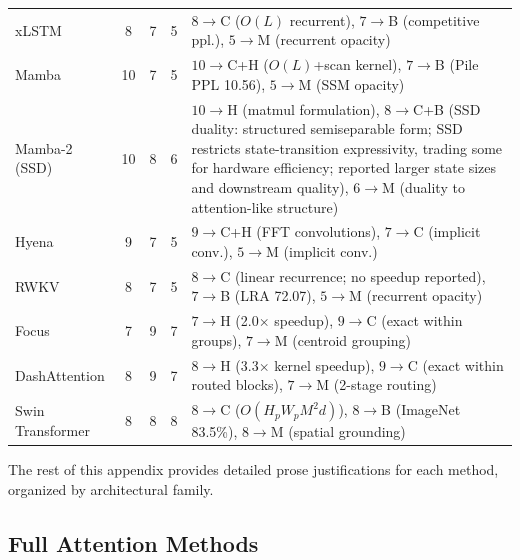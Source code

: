 \documentclass[10pt,twocolumn]{article}
\begin{document}
\begin{table}[!tbp]
\begin{tabular}{p{2.2cm}c c c p{5.5cm}}
xLSTM & 8 & 7 & 5 & $8\!\to\!$C ($O(L)$ recurrent), $7\!\to\!$B (competitive ppl.), $5\!\to\!$M (recurrent opacity) \\
Mamba & 10 & 7 & 5 & $10\!\to\!$C+H ($O(L)$+scan kernel), $7\!\to\!$B (Pile PPL 10.56), $5\!\to\!$M (SSM opacity) \\
Mamba-2 (SSD) & 10 & 8 & 6 & $10\!\to\!$H (matmul formulation), $8\!\to\!$C+B (SSD duality: structured semiseparable form; SSD restricts state-transition expressivity, trading some for hardware efficiency; reported larger state sizes and downstream quality), $6\!\to\!$M (duality to attention-like structure) \\
Hyena & 9 & 7 & 5 & $9\!\to\!$C+H (FFT convolutions), $7\!\to\!$C (implicit conv.), $5\!\to\!$M (implicit conv.) \\
RWKV & 8 & 7 & 5 & $8\!\to\!$C (linear recurrence; no speedup reported), $7\!\to\!$B (LRA 72.07), $5\!\to\!$M (recurrent opacity) \\
Focus & 7 & 9 & 7 & $7\!\to\!$H (2.0$\times$ speedup), $9\!\to\!$C (exact within groups), $7\!\to\!$M (centroid grouping) \\
DashAttention & 8 & 9 & 7 & $8\!\to\!$H (3.3$\times$ kernel speedup), $9\!\to\!$C (exact within routed blocks), $7\!\to\!$M (2-stage routing) \\
Swin Transformer & 8 & 8 & 8 & $8\!\to\!$C ($O(H_pW_pM^2d)$), $8\!\to\!$B (ImageNet 83.5\%), $8\!\to\!$M (spatial grounding) \\
\bottomrule
\end{tabular}
\end{table}

The rest of this appendix provides detailed prose justifications for each method, organized by architectural family.

\subsection*{Full Attention Methods}
\end{document}
